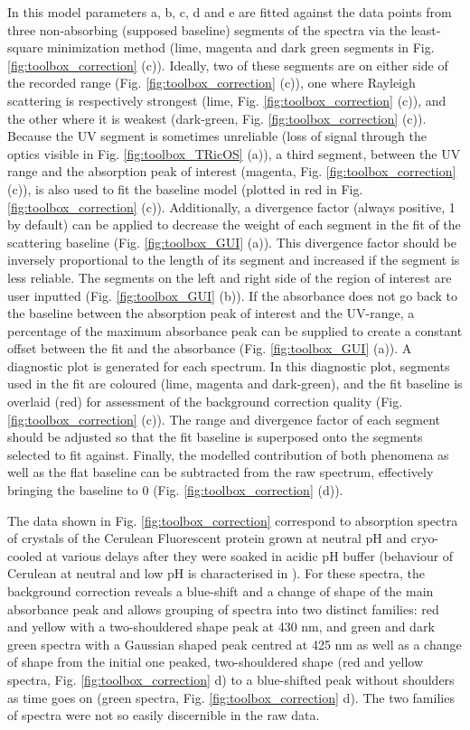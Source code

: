 In this model parameters a, b, c, d and e are fitted against the data points from three non-absorbing (supposed baseline) segments of the spectra via the least-square minimization method (lime, magenta and dark green segments in Fig. \ref{fig:toolbox_correction} (c)). Ideally, two of these segments are on either side of the recorded range (Fig. \ref{fig:toolbox_correction} (c)), one where Rayleigh scattering is respectively strongest (lime, Fig. \ref{fig:toolbox_correction} (c)), and the other where it is weakest (dark-green, Fig. \ref{fig:toolbox_correction} (c)). Because the UV segment is sometimes unreliable (loss of signal through the optics visible in Fig. \ref{fig:toolbox_TRicOS} (a)), a third segment, between the UV range and the absorption peak of interest (magenta, Fig. \ref{fig:toolbox_correction} (c)), is also used to fit the baseline model (plotted in red in Fig. \ref{fig:toolbox_correction} (c)). Additionally, a divergence factor (always positive, 1 by default) can be applied to decrease the weight of each segment in the fit of the scattering baseline (Fig. \ref{fig:toolbox_GUI} (a)). This divergence factor should be inversely proportional to the length of its segment and increased if the segment is less reliable. The segments on the left and right side of the region of interest are user inputted (Fig. \ref{fig:toolbox_GUI} (b)). If the absorbance does not go back to the baseline between the absorption peak of interest and the UV-range, a percentage of the maximum absorbance peak can be supplied to create a constant offset between the fit and the absorbance (Fig. \ref{fig:toolbox_GUI} (a)). A diagnostic plot is generated for each spectrum. In this diagnostic plot, segments used in the fit are coloured (lime, magenta and dark-green), and the fit baseline is overlaid (red) for assessment of the background correction quality (Fig. \ref{fig:toolbox_correction} (c)). The range and divergence factor of each segment should be adjusted so that the fit baseline is superposed onto the segments selected to fit against. Finally, the modelled contribution of both phenomena as well as the flat baseline can be subtracted from the raw spectrum, effectively bringing the baseline to 0 (Fig. \ref{fig:toolbox_correction} (d)). 

The data shown in Fig. \ref{fig:toolbox_correction} correspond to absorption spectra of crystals of the Cerulean Fluorescent protein grown at neutral pH and cryo-cooled at various delays after they were soaked in acidic pH buffer (behaviour of Cerulean at neutral and low pH is characterised in \parencite{gotthardChromophoreIsomerStabilization2017a}).  For these spectra, the background correction reveals a blue-shift and a change of shape of the main absorbance peak and allows grouping of spectra into two distinct families: red and yellow with a two-shouldered shape peak at 430 nm, and green and dark green spectra with a Gaussian shaped peak centred at 425 nm as well as a change of shape from the initial one peaked, two-shouldered shape (red and yellow spectra, Fig. \ref{fig:toolbox_correction} d) to a blue-shifted peak without shoulders as time goes on (green spectra, Fig. \ref{fig:toolbox_correction} d). The two families of spectra were not so easily discernible in the raw data.

